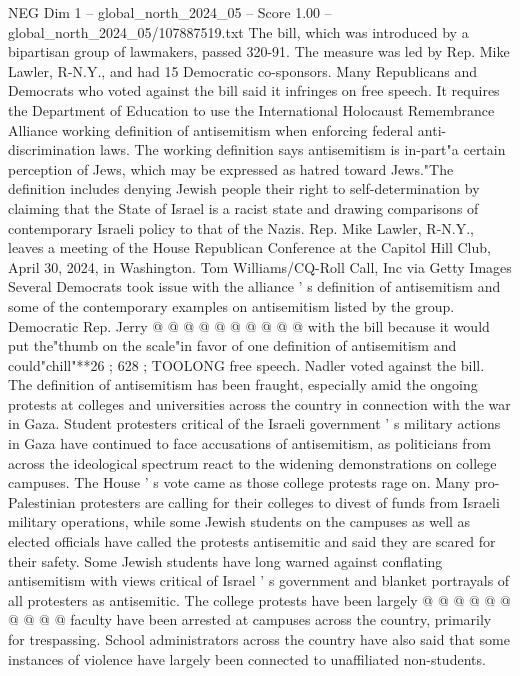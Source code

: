\begin{textsample}{NEG Dim 1 – global\_north\_2024\_05 – Score 1.00 – global\_north\_2024\_05/107887519.txt}  \label{ex:f1_neg_055}
The bill, which was introduced by a bipartisan group of lawmakers, passed 320-91.
The measure was led by Rep.
Mike Lawler, R-N.Y., and had 15 Democratic co-sponsors.
Many Republicans and Democrats who voted against the bill said it infringes on free speech.
It requires the Department of Education to use the International Holocaust Remembrance Alliance working definition of antisemitism when enforcing federal anti-discrimination laws.
The working definition says antisemitism is in-part"a certain perception of Jews, which may be expressed as hatred toward Jews."The definition includes denying Jewish people their right to self-determination by claiming that the State of Israel is a racist state and drawing comparisons of contemporary Israeli policy to that of the Nazis.
Rep.
Mike Lawler, R-N.Y., leaves a meeting of the House Republican Conference at the Capitol Hill Club, April 30, 2024, in Washington.
Tom Williams/CQ-Roll Call, Inc via Getty Images Several Democrats took issue with the alliance ' s definition of antisemitism and some of the contemporary examples on antisemitism listed by the group.
Democratic Rep.
Jerry @ @ @ @ @ @ @ @ @ @ with the bill because it would put the"thumb on the scale"in favor of one definition of antisemitism and could"chill"**26 ; 628 ; TOOLONG free speech.
Nadler voted against the bill.
The definition of antisemitism has been fraught, especially amid the ongoing protests at colleges and universities across the country in connection with the war in Gaza.
Student protesters critical of the Israeli government ' s military actions in Gaza have continued to face accusations of antisemitism, as politicians from across the ideological spectrum react to the widening demonstrations on college campuses.
The House ' s vote came as those college protests rage on.
Many pro-Palestinian protesters are calling for their colleges to divest of funds from Israeli military operations, while some Jewish students on the campuses as well as elected officials have called the protests antisemitic and said they are scared for their safety.
Some Jewish students have long warned against conflating antisemitism with views critical of Israel ' s government and blanket portrayals of all protesters as antisemitic.
The college protests have been largely @ @ @ @ @ @ @ @ @ @ faculty have been arrested at campuses across the country, primarily for trespassing.
School administrators across the country have also said that some instances of violence have largely been connected to unaffiliated non-students.

\end{textsample}
